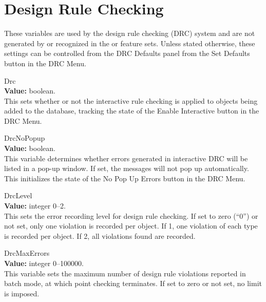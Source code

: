 \section{Design Rule Checking}
\label{drcvars}

These variables are used by the design rule checking (DRC) system and
are not generated by or recognized in the {\XicII} or {\Xiv} feature
sets.  Unless stated otherwise, these settings can be controlled from
the {\cb DRC Defaults} panel from the {\cb Set Defaults} button in the
{\cb DRC Menu}.

\begin{description}

\item{\et Drc}\\
{\bf Value:} boolean.\\
This sets whether or not the interactive rule checking is applied to
objects being added to the database, tracking the state of the {\cb
Enable Interactive} button in the {\cb DRC Menu}.

\item{\et DrcNoPopup}\\
{\bf Value:} boolean.\\
This variable determines whether errors generated in interactive DRC
will be listed in a pop-up window.  If set, the messages will not pop
up automatically.  This initializes the state of the {\cb No Pop Up
Errors} button in the {\cb DRC Menu}.

\item{\et DrcLevel}\\
{\bf Value:} integer 0--2.\\
This sets the error recording level for design rule checking.  If set
to zero (``0'') or not set, only one violation is recorded per object. 
If 1, one violation of each type is recorded per object.  If 2, all
violations found are recorded.

\item{\vt DrcMaxErrors}\\
{\bf Value:} integer 0--100000.\\
This variable sets the maximum number of design rule violations
reported in batch mode, at which point checking terminates.  If set to
zero or not set, no limit is imposed.


\end{description}
